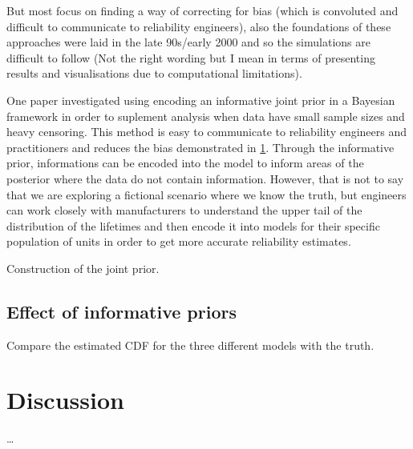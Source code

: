 But most focus on finding a way of correcting for bias (which is convoluted and difficult to communicate to reliability engineers), also the foundations of these approaches were laid in the late 90s/early 2000 and so the simulations are difficult to follow (Not the right wording but I mean in terms of presenting results and visualisations due to computational limitations).

One paper \citep{kaminskiy2005} investigated using encoding an informative joint prior in a Bayesian framework in order to suplement analysis when data have small sample sizes and heavy censoring. This method is easy to communicate to reliability engineers and practitioners and reduces the bias demonstrated in \ref{}. Through the informative prior, informations can be encoded into the model to inform areas of the posterior where the data do not contain information. However, that is not to say that we are exploring a fictional scenario where we know the truth, but engineers can work closely with manufacturers to understand the upper tail of the distribution of the lifetimes and then encode it into models for their specific population of units in order to get more accurate reliability estimates.

Construction of the joint prior.

\subsection{Effect of informative priors}

Compare the estimated CDF for the three different models with the truth.

\section{Discussion}

\ldots